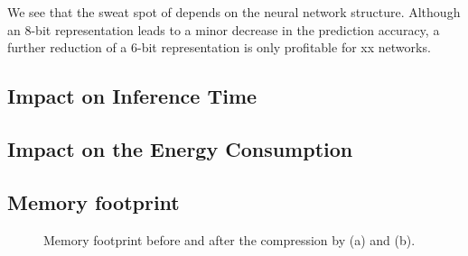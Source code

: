 We see that the sweat spot of \quantization depends on the neural network structure. Although an 8-bit representation leads to a minor
decrease in the prediction accuracy, a further reduction of a 6-bit representation is only profitable for xx networks.

\subsection{Impact on Inference Time}


\subsection{Impact on the Energy Consumption}


\subsection{Memory footprint}
\begin{figure}[!t]
\centering
{}
\hfill
{}
\hfill

\caption{Memory footprint before and after the compression by \quantization(a) and \pruning (b).}
\label{fig:footprint}
\end{figure}
